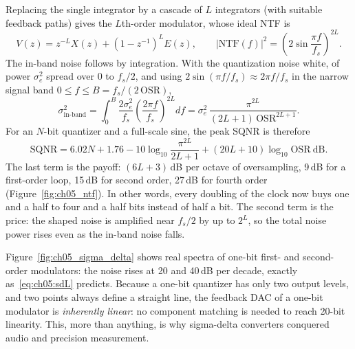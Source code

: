 Replacing the single integrator by a cascade of $L$ integrators (with suitable feedback paths)
gives the $L$th-order modulator, whose ideal NTF is
\begin{equation}
V(z)=z^{-L}X(z)+(1-z^{-1})^L E(z),\qquad |\mathrm{NTF}(f)|^2=\left(2\sin\frac{\pi f}{f_s}\right)^{2L}.
\label{eq:ch05:sdL}
\end{equation}
The in-band noise follows by integration. With the quantization noise white, of power
$\sigma_e^2$ spread over $0$ to $f_s/2$, and using $2\sin(\pi f/f_s)\approx2\pi f/f_s$ in the
narrow signal band $0\le f\le B=f_s/(2\,\mathrm{OSR})$,
\begin{equation}
\sigma_{\text{in-band}}^2=\int_0^B\frac{2\sigma_e^2}{f_s}\left(\frac{2\pi f}{f_s}\right)^{2L}df
=\sigma_e^2\,\frac{\pi^{2L}}{(2L+1)\,\mathrm{OSR}^{2L+1}}.
\label{eq:ch05:sdnoise}
\end{equation}
For an $N$-bit quantizer and a full-scale sine, the peak SQNR is therefore
\begin{equation}
\text{SQNR}=6.02N+1.76-10\log_{10}\frac{\pi^{2L}}{2L+1}+(20L+10)\log_{10}\mathrm{OSR}\ \text{dB}.
\label{eq:ch05:sdsqnr}
\end{equation}
The last term is the payoff: $(6L+3)$\,dB per octave of oversampling, 9\,dB for a first-order loop,
15\,dB for second order, 27\,dB for fourth order (Figure~\ref{fig:ch05_ntf}). In other words, every
doubling of the clock now buys one and a half to four and a half bits instead of half a bit. The
second term is the price: the shaped noise is amplified near $f_s/2$ by up to $2^L$, so the total
noise power rises even as the in-band noise falls.



Figure~\ref{fig:ch05_sigma_delta} shows real spectra of one-bit first- and second-order
modulators: the noise rises at 20 and 40\,dB per decade, exactly as~\eqref{eq:ch05:sdL} predicts.
Because a one-bit quantizer has only two output levels, and two points always define a straight
line, the feedback DAC of a one-bit modulator is \emph{inherently linear}: no component matching
is needed to reach 20-bit linearity. This, more than anything, is why sigma-delta converters
conquered audio and precision measurement.

